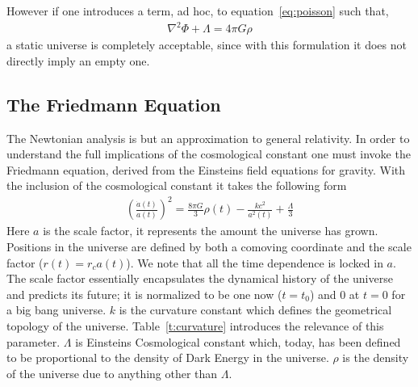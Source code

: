 \documentclass[twoside]{article}
\begin{document}
However if one introduces a term, ad hoc, to equation~\ref{eq:poisson} such that,
\begin{align}
\nabla^{2}\Phi + \Lambda = 4\pi G\rho
\end{align}
a static universe is completely acceptable, since with this formulation it does not directly imply an empty one.

\subsection{The Friedmann Equation}\label{s:friedCurv}

The Newtonian analysis is but an approximation to general relativity. In order to understand the full implications of the cosmological constant one must invoke the Friedmann equation, derived from the Einsteins field equations for gravity. With the inclusion of the cosmological constant it takes the following form
\begin{align}
\left(\frac{\dot{a}(t)}{a(t)}\right)^{2} = \frac{8\pi G}{3}\rho(t)-\frac{kc^{2}}{a^{2}(t)} + \frac{\Lambda}{3}\label{eq:fried}
\end{align}
Here $a$ is the scale factor, it represents the amount the universe has grown. Positions in the universe are defined by both a comoving coordinate and the scale factor ($r(t) = r_{c}a(t)$). We note that all the time dependence is locked in $a$. The scale factor essentially encapsulates the dynamical history of the universe and predicts its future; it is normalized to be one now ($t=t_{0}$) and 0 at $t=0$ for a big bang universe. $k$ is the curvature constant which defines the geometrical topology of the universe. Table~\ref{t:curvature} introduces the relevance of this parameter. $\Lambda$ is Einsteins Cosmological constant which, today, has been defined to be proportional to the density of Dark Energy in the universe.   $\rho$ is the density of the universe due to anything other than $\Lambda$.
\end{document}

